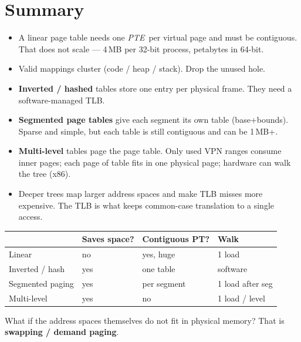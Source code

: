 \documentclass[11pt,a4paper]{article}
\newcommand{\pte}{\textit{PTE}}
\begin{document}
\section{Summary}

\begin{keybox}
\begin{itemize}
  \item A linear page table needs one \pte\ per virtual page and must be
        contiguous. That does not scale --- 4\,MB per 32-bit process,
        petabytes in 64-bit.
  \item Valid mappings cluster (code / heap / stack). Drop the unused
        hole.
  \item \textbf{Inverted / hashed} tables store one entry per physical
        frame. They need a software-managed TLB.
  \item \textbf{Segmented page tables} give each segment its own table
        (base+bounds). Sparse and simple, but each table is still
        contiguous and can be 1\,MB+.
  \item \textbf{Multi-level} tables page the page table. Only used VPN
        ranges consume inner pages; each page of table fits in one
        physical page; hardware can walk the tree (x86).
  \item Deeper trees map larger address spaces and make TLB misses
        more expensive. The TLB is what keeps common-case translation
        to a single access.
\end{itemize}
\end{keybox}

\begin{center}
\renewcommand{\arraystretch}{1.18}
\begin{tabular}{@{}llll@{}}
  \toprule
  & \textbf{Saves space?} & \textbf{Contiguous PT?} & \textbf{Walk} \\
  \midrule
  Linear            & no  & yes, huge     & 1 load \\
  Inverted / hash   & yes & one table     & software \\
  Segmented paging  & yes & per segment   & 1 load after seg \\
  Multi-level       & yes & no            & 1 load / level \\
  \bottomrule
\end{tabular}
\end{center}

\begin{warnbox}
What if the address spaces themselves do not fit in physical memory?
That is \textbf{swapping / demand paging}.
\end{warnbox}
\end{document}
